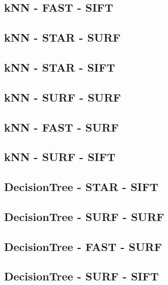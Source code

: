 \subsection{kNN - FAST - SIFT}
  

\subsection{kNN - STAR - SURF}
  

\subsection{kNN - STAR - SIFT}
 

\subsection{kNN - SURF - SURF}


\subsection{kNN - FAST - SURF}
  

\subsection{kNN - SURF - SIFT}
  

\subsection{DecisionTree - STAR - SIFT}
  

\subsection{DecisionTree - SURF - SURF}
  

\subsection{DecisionTree - FAST - SURF}
 
 
\subsection{DecisionTree - SURF - SIFT}


